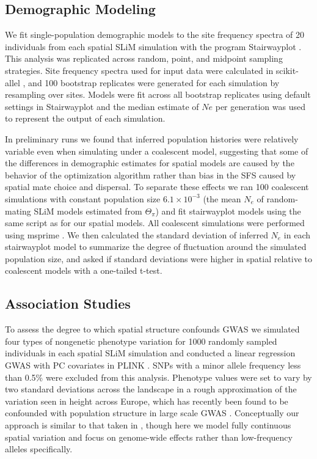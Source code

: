 \documentclass[11pt,twoside,lineno]{preprint}
\begin{document}
\subsection{Demographic Modeling}
We fit single-population demographic models to the site frequency spectra of 20 individuals from each spatial SLiM simulation with the program Stairwayplot \citep{Liu2015}. This analysis was replicated across random, point, and midpoint sampling strategies. Site frequency spectra used for input data were calculated in scikit-allel \citep{Miles2017}, and 100 bootstrap replicates were generated for each simulation by resampling over sites. Models were fit across all bootstrap replicates using default settings in Stairwayplot and the median estimate of $Ne$ per generation was used to represent the output of each simulation.

In preliminary runs we found that inferred population histories were relatively variable even when simulating under a coalescent model, suggesting that some of the differences in demographic estimates for spatial models are caused by the behavior of the optimization algorithm rather than bias in the SFS caused by spatial mate choice and dispersal. To separate these effects we ran 100 coalescent simulations with constant population size $6.1\times 10^{-3}$ (the mean $N_{e}$ of random-mating SLiM models estimated from $\Theta_{\pi}$) and fit stairwayplot models using the same script as for our spatial models. All coalescent simulations were performed using msprime \citep{Kelleher2016}. We then calculated the standard deviation of inferred $N_{e}$ in each stairwayplot model to summarize the degree of fluctuation around the simulated population size, and asked if standard deviations were higher in spatial relative to coalescent models with a one-tailed t-test.

\subsection{Association Studies}
To assess the degree to which spatial structure confounds GWAS we simulated four types of nongenetic phenotype variation for 1000 randomly sampled individuals in each spatial SLiM simulation and conducted a linear regression GWAS with PC covariates in PLINK \citep{PURCELL2007}. SNPs with a minor allele frequency less than 0.5\% were excluded from this analysis. Phenotype values were set to vary by two standard deviations across the landscape in a rough approximation of the variation seen in height across Europe, which has recently been found to be confounded with population structure in large scale GWAS \citep{Berg2018,Sohail2018}. Conceptually our approach is similar to that taken in \citep{Mathieson2012}, though here we model fully continuous spatial variation and focus on genome-wide effects rather than low-frequency alleles specifically. 
\end{document}
